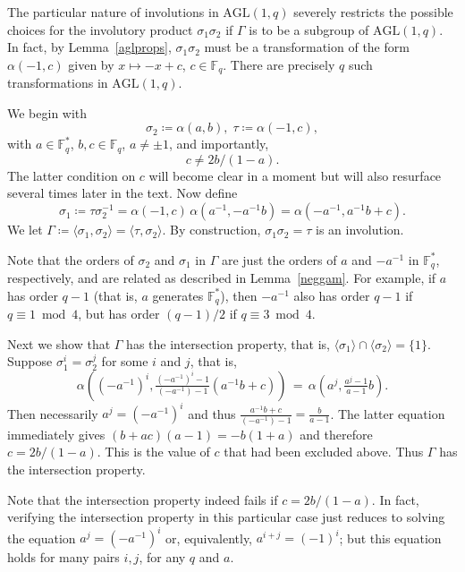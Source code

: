 \documentclass[12pt]{article}
\theoremstyle{definition}\newtheorem{definition}{Definition}[section]
\begin{document}
The particular nature of involutions in $\mathrm{AGL}(1,q)$ severely restricts the possible choices for the involutory product $\sigma_1\sigma_2$ if $\Gamma$ is to be a subgroup of $\mathrm{AGL}(1,q)$. In fact, by Lemma~\ref{aglprops}, $\sigma_1\sigma_2$ must be a transformation of the form $\alpha(-1,c)$ given by $x \mapsto -x+c$, $c\in \mathbb{F}_q$. There are precisely $q$ such transformations in $\mathrm{AGL}(1,q)$.

We begin with 
\begin{equation}
\label{sig2}
\sigma_{2}\coloneqq \alpha(a,b),\;\tau\coloneqq \alpha(-1,c),
\end{equation}
with $a\in\mathbb{F}_q^*$, $b,c\in\mathbb{F}_q$, $a\neq \pm 1$, and importantly,
\begin{equation}
\label{condabc}
c\neq 2b/(1-a).
\end{equation}
The latter condition on $c$ will become clear in a moment but will also resurface several times later in the text. Now define 
\begin{equation}
\label{sig1}
\sigma_{1}\coloneqq \tau\sigma_2^{-1} = \alpha(-1,c)\,\alpha(a^{-1},-a^{-1}b)=\alpha(-a^{-1},a^{-1}b+c) .
\end{equation}
We let $\Gamma\coloneqq \langle\sigma_1,\sigma_2\rangle=\langle\tau,\sigma_2\rangle$. By construction, $\sigma_1\sigma_2=\tau$ is an involution. 

Note that the orders of $\sigma_2$ and $\sigma_1$ in $\Gamma$ are just the orders of $a$ and $-a^{-1}$ in $\mathbb{F}_q^*$, respectively, and are related as described in Lemma~\ref{neggam}. For example, if $a$ has order $q-1$ (that is, $a$ generates $\mathbb{F}_q^*$), then $-a^{-1}$ also has order $q-1$ if $q\equiv 1 \bmod 4$, but has order $(q-1)/2$ if $q\equiv 3 \bmod 4$. 

Next we show that $\Gamma$ has the intersection property, that is, 
$\langle\sigma_1\rangle \cap \langle\sigma_2\rangle = \{1\}$. Suppose $\sigma_1^i = \sigma_2^j$ for some $i$ and $j$, that is,
\[\alpha((-a^{-1})^{i},\tfrac{(-a^{-1})^i-1}{(-a^{-1})-1}(a^{-1}b+c))
\,=\, \alpha(a^j, \tfrac{a^j-1}{a-1}b) .\]
Then necessarily $a^j=(-a^{-1})^i$ and thus 
$\tfrac{a^{-1}b+c}{(-a^{-1})-1}=\tfrac{b}{a-1}$. 
The latter equation immediately gives $(b+ac)(a-1)=-b(1+a)$ and therefore $c=2b/(1-a)$. This is the value of $c$ that had been excluded above. Thus $\Gamma$ has the intersection property. 

Note that the intersection property indeed fails if $c=2b/(1-a)$. In fact, verifying the intersection property in this particular case just reduces to solving the equation $a^j=(-a^{-1})^i$ or, equivalently, $a^{i+j}=(-1)^i$; but this equation holds for many pairs $i,j$, for any $q$ and $a$.
\end{document}
